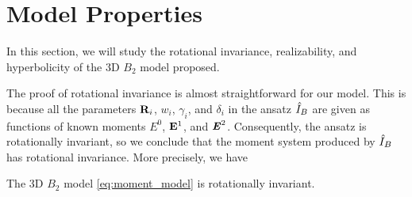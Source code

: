 
\section{Model Properties}\label{sec:properties}

In this section, we will study the rotational invariance, realizability,
and hyperbolicity of the 3D $B_2$ model proposed.

The proof of rotational invariance is almost straightforward for our
model. This is because all the parameters $\mathbf{R}_i$, $w_i$,
$\gamma_i$, and $\delta_i$ in the ansatz $\hat I_B$ are given as
functions of known moments $E^0$, $\mathbf{E}^1$, and $\boldsymbol{\mathit{E}}^2$. Consequently,
the ansatz is rotationally invariant, so we conclude that the
moment system produced by $\hat I_B$ has rotational
invariance. More precisely, we have 
\begin{theorem}\label{lem:rotational_invariant}
  The 3D $B_2$ model \eqref{eq:moment_model} is rotationally invariant.
\end{theorem}
